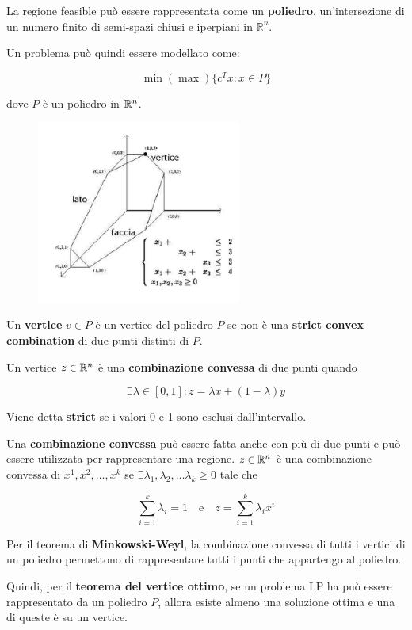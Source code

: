 \noindent La regione feasible può essere rappresentata come un \textbf{poliedro}, un'intersezione di un numero finito di semi-spazi chiusi e iperpiani in $\mathbb{R}^n$.

Un problema può quindi essere modellato come:

$$
\min (\max) \{c^T x : x \in P\}
$$

\noindent dove $P$ è un poliedro in $\mathbb{R}^n$.

\begin{figure}[htbp]
	\centering
	\includegraphics[width=0.6\textwidth]{images/l9-fig-1.png}
\end{figure}

\noindent Un \textbf{vertice} $v \in P$ è un vertice del poliedro $P$ se non è una \textbf{strict convex combination} di due punti distinti di $P$.

Un vertice $z \in \mathbb{R}^n$ è una \textbf{combinazione convessa} di due punti quando

$$
\exists \lambda \in [0,1] : z = \lambda x + (1-\lambda)y
$$

\noindent Viene detta \textbf{strict} se i valori 0 e 1 sono esclusi dall'intervallo.

Una \textbf{combinazione convessa} può essere fatta anche con più di due punti e può essere utilizzata per rappresentare una regione.
$z \in \mathbb{R}^n$ è una combinazione convessa di $x^1, x^2, \ldots, x^k$ se $\exists \lambda_1, \lambda_2, \ldots \lambda_k \geq 0$ tale che 

$$
\sum\limits_{i=1}^{k} \lambda_i = 1 \quad \text{e}\quad z = \sum\limits_{i=1}^{k} \lambda_ix^i
$$

\noindent Per il teorema di \textbf{Minkowski-Weyl}, la combinazione convessa di tutti i vertici di un poliedro permettono di rappresentare tutti i punti che appartengo al poliedro.

Quindi, per il \textbf{teorema del vertice ottimo}, se un problema LP ha può essere rappresentato da un poliedro $P$, allora esiste almeno una soluzione ottima e una di queste è su un vertice.

